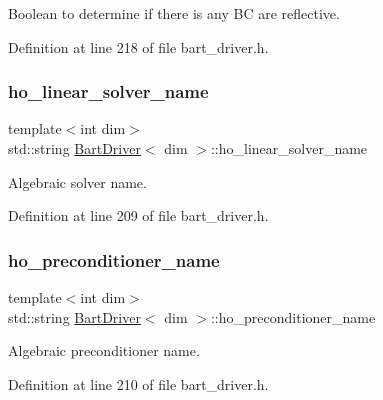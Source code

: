 Boolean to determine if there is any BC are reflective. 



Definition at line 218 of file bart\+\_\+driver.\+h.

\mbox{\label{class_bart_driver_a7dcefb31d64ad2e76d4c04a44cb26f7c}} 
\subsubsection{\texorpdfstring{ho\+\_\+linear\+\_\+solver\+\_\+name}{ho\_linear\_solver\_name}}
{\footnotesize\ttfamily template$<$int dim$>$ \\
std\+::string \hyperlink{class_bart_driver}{Bart\+Driver}$<$ dim $>$\+::ho\+\_\+linear\+\_\+solver\+\_\+name\hspace{0.3cm}{\ttfamily [private]}}



Algebraic solver name. 



Definition at line 209 of file bart\+\_\+driver.\+h.

\mbox{\label{class_bart_driver_a0662a7c4208dc352aec9adf789edb463}} 
\subsubsection{\texorpdfstring{ho\+\_\+preconditioner\+\_\+name}{ho\_preconditioner\_name}}
{\footnotesize\ttfamily template$<$int dim$>$ \\
std\+::string \hyperlink{class_bart_driver}{Bart\+Driver}$<$ dim $>$\+::ho\+\_\+preconditioner\+\_\+name\hspace{0.3cm}{\ttfamily [private]}}



Algebraic preconditioner name. 



Definition at line 210 of file bart\+\_\+driver.\+h.

\mbox{\label{class_bart_driver_a83323d9561c906f6094a51a5c936cea4}} 
